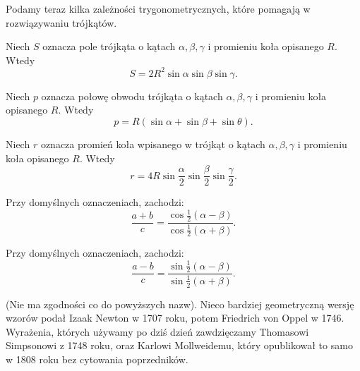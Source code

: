 
Podamy teraz kilka zależności trygonometrycznych, które pomagają w rozwiązywaniu trójkątów.

\begin{proposition}
    Niech $S$ oznacza pole trójkąta o kątach $\alpha, \beta, \gamma$ i promieniu koła opisanego $R$.
    Wtedy
    \begin{equation}
    S = 2 R^2 \sin \alpha \sin \beta \sin \gamma.
    \end{equation}
\end{proposition}

\begin{proposition}
    Niech $p$ oznacza połowę obwodu trójkąta o kątach $\alpha, \beta, \gamma$ i promieniu koła opisanego $R$.
    Wtedy
    \begin{equation}
        p = R (\sin \alpha + \sin \beta + \sin \theta).
    \end{equation}
\end{proposition}

\begin{proposition}
    Niech $r$ oznacza promień koła wpisanego w trójkąt o kątach $\alpha, \beta, \gamma$ i promieniu koła opisanego $R$.
    Wtedy
    \begin{equation}
        r = 4R \sin \frac \alpha 2 \sin \frac \beta 2 \sin \frac \gamma 2.
    \end{equation}
\end{proposition}

\begin{proposition}
%
    Przy domyślnych oznaczeniach, zachodzi:
    \begin{equation}
        \frac{a + b}{c} = \frac{\cos \frac 1 2 (\alpha - \beta)}{\cos \frac 1 2 (\alpha + \beta)}.
    \end{equation}
\end{proposition}

\begin{proposition}
%
    Przy domyślnych oznaczeniach, zachodzi:
    \begin{equation}
        \frac{a - b}{c} = \frac{\sin \frac 1 2 (\alpha - \beta)}{\sin \frac 1 2 (\alpha + \beta)}.
    \end{equation}
\end{proposition}

(Nie ma zgodności co do powyższych nazw).
Nieco bardziej geometryczną wersję wzorów podał Izaak Newton w 1707 roku, potem Friedrich von Oppel w 1746.
%
%
Wyrażenia, których używamy po dziś dzień zawdzięczamy Thomasowi Simpsonowi z 1748 roku, oraz Karlowi Mollweidemu, który opublikował to samo w 1808 roku bez cytowania poprzedników.
%
%

